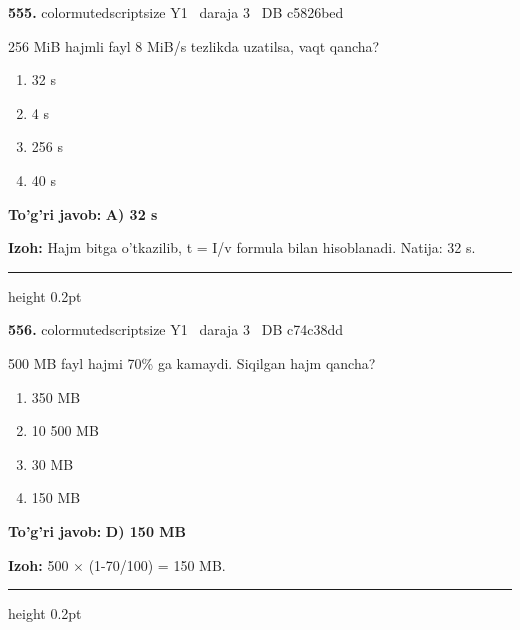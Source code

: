 \documentclass[10pt,a4paper,oneside]{article}
\begin{document}
\noindent\textbf{\color{ink}555.}  {color{muted}scriptsize Y1 \textbullet\ daraja 3 \textbullet\ DB c5826bed}
\par
256 MiB hajmli fayl 8 MiB/s tezlikda uzatilsa, vaqt qancha?
\begin{enumerate}[label=\Alph*),leftmargin=9mm]
\item 32 s
\item 4 s
\item 256 s
\item 40 s
\end{enumerate}
\begin{tcolorbox}[enhanced,breakable,colback=teal!4,colframe=teal!50!black,boxrule=0.5pt,arc=1.1mm,left=3mm,right=3mm,top=1.7mm,bottom=1.7mm,before skip=2mm,after skip=2mm]
\textbf{\color{teal}To'g'ri javob:} \textbf{A) 32 s}
\par\smallskip
\textbf{Izoh:} Hajm bitga o'tkazilib, t = I/v formula bilan hisoblanadi. Natija: 32 s.
\end{tcolorbox}
\vspace{2mm}\hrule height 0.2pt \vspace{3mm}

\noindent\textbf{\color{ink}556.}  {color{muted}scriptsize Y1 \textbullet\ daraja 3 \textbullet\ DB c74c38dd}
\par
500 MB fayl hajmi 70\% ga kamaydi. Siqilgan hajm qancha?
\begin{enumerate}[label=\Alph*),leftmargin=9mm]
\item 350 MB
\item 10 500 MB
\item 30 MB
\item 150 MB
\end{enumerate}
\begin{tcolorbox}[enhanced,breakable,colback=teal!4,colframe=teal!50!black,boxrule=0.5pt,arc=1.1mm,left=3mm,right=3mm,top=1.7mm,bottom=1.7mm,before skip=2mm,after skip=2mm]
\textbf{\color{teal}To'g'ri javob:} \textbf{D) 150 MB}
\par\smallskip
\textbf{Izoh:} 500 \ensuremath{\times} (1-70/100) = 150 MB.
\end{tcolorbox}
\vspace{2mm}\hrule height 0.2pt \vspace{3mm}
\end{document}

